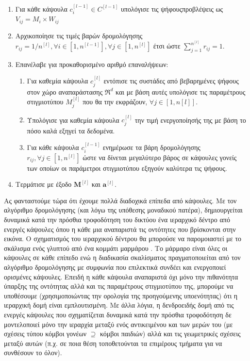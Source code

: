 \begin{enumerate}
  \item Για κάθε κάψουλα $c_i^{[l-1]} \in C^{[l-1]}$ υπολόγισε τις ψήφους\textendash προβλέψεις ως $V_{ij}=M_i \times W_{ij}$
  \item Αρχικοποίησε τις τιμές βαρών δρομολόγησης $r_{ij}=1/n^{[l]},\forall i \in [1,n^{[l-1]}],\forall j \in [1,n^{[l]}]$ έτσι ώστε $\sum_{j = 1}^{n^{[l]}}r_{ij} = 1$.
  \item Επανέλαβε για προκαθορισμένο αριθμό επαναλήψεων:
  \begin{enumerate}
    \item Για καθεμία κάψουλα $c_j^{[l]}$ εντόπισε τις συστάδες από βεβαρημένες ψήφους στον χώρο αναπαράστασης $\Re^d$ και με βάση αυτές υπολόγισε τις παραμέτρους στιγμιοτύπου $M_j^{[l]}$ που θα την εκφράζουν, $\forall j \in [1,n{[l]}]$.
    \item Υπολόγισε για καθεμία κάψουλα $c_j^{[l]}$ την τιμή ενεργοποίησής της με βάση το πόσο καλά εξηγεί τα δεδομένα.
    \item Για κάθε κάψουλα $c_i^{[l-1]}$ ενημέρωσε τα βάρη δρομολόγησης $r_{ij}, \forall j \in [1,n^{[l]}]$ ώστε να δίνεται μεγαλύτερο βάρος σε κάψουλες γονείς των οποίων οι παράμετροι στιγμιοτύπου εξηγούν καλύτερα τις ψήφους.
  \end{enumerate}
    
  \item Τερμάτισε με έξοδο $\boldsymbol{M}^{[l]}$ και $\boldsymbol{a}^{[l]}$.
\end{enumerate}

Ας φανταστούμε τώρα ότι έχουμε πολλά διαδοχικά επίπεδα από κάψουλες. Με τον αλγόριθμο δρομολόγησης (και λόγω της υπόθεσης μοναδικού πατέρα), δημιουργείται δυναμικά κατά την πρόσθια τροφοδότηση του δικτύου ένα ιεραρχικό δέντρο από ενεργές κάψουλες όπου η κάθε μια αναπαριστά τις οντότητες που βρίσκονται στην εικόνα. Ο σχηματισμός του ιεραρχικού δέντρου θα μπορούσε να παρομοιαστεί με το σκάλισμα ενός γλυπτού από ένα κομμάτι μαρμάρου \cite{sabour2017dynamic}. Το μάρμαρο είναι όλες οι κάψουλες σε κάθε επίπεδο ενώ η διαδικασία σκαλίσματος πραγματοποιείται από τον αλγόριθμο δρομολόγησης με συμφωνία που επιλεκτικά συνδέει και ενεργοποιεί ορισμένες κάψουλες. Επειδή η κάθε κάψουλα αναπαριστά όχι μόνο την πιθανότητα ύπαρξης της οντότητας αλλά και τις παραμέτρους στιγμιοτύπου της, μπορούμε να υποθέσουμε (χρησιμοποιώντας την ορολογία της προηγούμενης υποενότητας) ότι η ιεραρχική δομή είναι εμπλουτισμένη. Με άλλα λόγια, η δενδροειδής δομή από τις ενεργές κάψουλες που σχηματίζεται δυναμικά κατά την πρόσθια τροφοδότηση δε μοντελοποιεί μόνο την ιεραρχία μεταξύ ενός αντικειμένου και των μερών του (με σχέσεις τύπου κόμβοι γονέων $\supseteq$ κόμβοι παιδιών) αλλά και τις γεωμετρικές σχέσεις μεταξύ αυτών (π.χ. σε ποια θέση τοποθετούνται τα επιμέρους τμήματα για να συνθέσουν το όλον).\par


